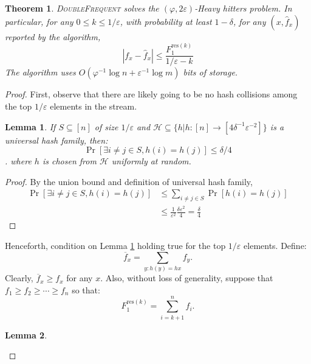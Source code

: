 \documentclass{article}
\newcommand{\ignore}[1]{}
\newcommand{\eps}{\varepsilon}
\renewcommand{\phi}{\varphi}
\newtheorem{lemma}{Lemma}
\newtheorem{theorem}{Theorem}
\begin{document}
\begin{multicols}{2}
\ignore{
	Proposed algorithm is simple algorithm with space complexity of $O(1/\varphi\log n + 1/\varepsilon\log {1/\varepsilon} + 1/\varepsilon \log s)$. In this proposed algorithm, upon picking item $x$ from stream S, If $x$ is already present in $\mathcal{T}_{1}$ then increment its counter value by 1.If $x$ is not present in $\mathcal{T}_{1}$ and $\mathcal{T}_{1}$ is not Full then put $x$ into $\mathcal{T}_{1}$ and make its counter value 1. If $x$ is not present in $\mathcal{T}_{1}$ and $\mathcal{T}_{1}$ is Full then decrement value for each counter value in $\mathcal{T}_{1}$ and if any counter value of some element say $y$ is zero then replace $y$ with $x$ and make $x$ counter value to be 1.
}
\begin{theorem}
\textsc{DoubleFrequent} solves the $(\phi, 2\eps)$-Heavy hitters problem. In particular, for any $0\leq k \leq 1/\eps$, with probability at least $1-\delta$, for any $(x,\hat{f}_x)$ reported by the algorithm,
$$|f_x - \hat{f}_x| \leq \frac{F_1^{\text{res}(k)}}{1/\eps - k}$$
The algorithm uses $O(\phi^{-1} \log n + \eps^{-1} \log m)$ bits of storage.
\end{theorem}
\begin{proof}
First, observe that there are likely going to be no hash collisions among the top $1/\eps$ elements in the stream.	
\begin{lemma}\label{lem:nocoll}
If $S \subseteq [n]$ of size $1/\varepsilon$ and $\mathcal{H} \subseteq \{h|h:[n]\to [4 \delta^{-1}\varepsilon^{-2}]\}$ is a universal hash family, then:
$$\Pr[\exists i \neq j \in S, h(i) = h(j)] \leq \delta/4$$.
 where $h$ is chosen from $\mathcal{H}$ uniformly at random.\\
\end{lemma}
\begin{proof}
By the union bound and definition of universal hash family,
\begin{align*}
\Pr[\exists i \neq j \in S, h(i) = h(j)] &\leq \sum_{i\neq j \in S} \Pr[h(i)=h(j)]\\ 
&\leq \frac{1}{\eps^2} \frac{\delta \eps^2}{4} = \frac{\delta}{4}
\end{align*}
\end{proof}
Henceforth, condition on Lemma \ref{lem:nocoll} holding true for the top $1/\eps$ elements. Define:
$$\overline{f}_x=\sum_{y:h(y)=h{x}}f_y.$$
Clearly, $\overline{f}_x \geq f_x$ for any $x$.
Also, without loss of generality, suppose that $f_1 \geq f_2 \geq \cdots \geq f_n$ so that:
$$F^{\text{res}(k)}_1=\sum_{i=k+1}^n f_{i}.$$
\begin{lemma}

\end{lemma}
\end{proof}
\end{multicols}
\end{document}
